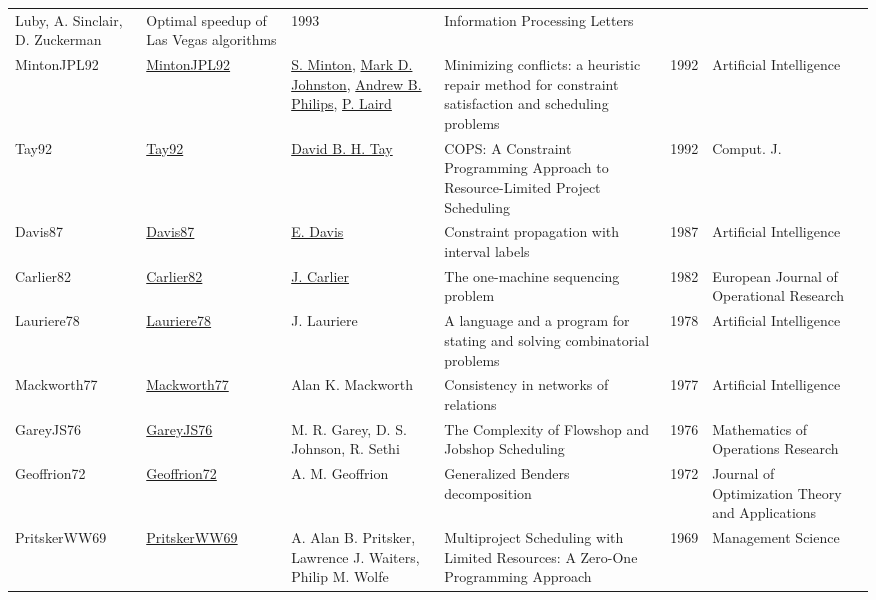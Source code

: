 {\begin{longtable}{p{2cm}p{2cm}p{5cm}p{10cm}rp{3cm}l}
Luby, A. Sinclair, D. Zuckerman & Optimal speedup of Las Vegas algorithms & 1993 & Information Processing Letters & \cite{LubySZ93}\\MintonJPL92 & \href{http://dx.doi.org/10.1016/0004-3702(92)90007-k}{MintonJPL92} & \hyperref[auth:a1236]{S. Minton}, \hyperref[auth:a1237]{Mark D. Johnston}, \hyperref[auth:a1238]{Andrew B. Philips}, \hyperref[auth:a1239]{P. Laird} & Minimizing conflicts: a heuristic repair method for constraint satisfaction and scheduling problems & 1992 & Artificial Intelligence & \cite{MintonJPL92}\\Tay92 & \href{}{Tay92} & \hyperref[auth:a709]{David B. H. Tay} & {COPS:} {A} Constraint Programming Approach to Resource-Limited Project Scheduling & 1992 & Comput. J. & \cite{Tay92}\\Davis87 & \href{http://dx.doi.org/10.1016/0004-3702(87)90091-9}{Davis87} & \hyperref[auth:a1241]{E. Davis} & Constraint propagation with interval labels & 1987 & Artificial Intelligence & \cite{Davis87}\\Carlier82 & \href{http://dx.doi.org/10.1016/s0377-2217(82)80007-6}{Carlier82} & \hyperref[auth:a854]{J. Carlier} & The one-machine sequencing problem & 1982 & European Journal of Operational Research & \cite{Carlier82}\\Lauriere78 & \href{http://dx.doi.org/10.1016/0004-3702(78)90029-2}{Lauriere78} & J. Lauriere & A language and a program for stating and solving combinatorial problems & 1978 & Artificial Intelligence & \cite{Lauriere78}\\Mackworth77 & \href{http://dx.doi.org/10.1016/0004-3702(77)90007-8}{Mackworth77} & Alan K. Mackworth & Consistency in networks of relations & 1977 & Artificial Intelligence & \cite{Mackworth77}\\GareyJS76 & \href{http://dx.doi.org/10.1287/moor.1.2.117}{GareyJS76} & M. R. Garey, D. S. Johnson, R. Sethi & The Complexity of Flowshop and Jobshop Scheduling & 1976 & Mathematics of Operations Research & \cite{GareyJS76}\\Geoffrion72 & \href{http://dx.doi.org/10.1007/bf00934810}{Geoffrion72} & A. M. Geoffrion & Generalized Benders decomposition & 1972 & Journal of Optimization Theory and Applications & \cite{Geoffrion72}\\PritskerWW69 & \href{http://dx.doi.org/10.1287/mnsc.16.1.93}{PritskerWW69} & A. Alan B. Pritsker, Lawrence J. Waiters, Philip M. Wolfe & Multiproject Scheduling with Limited Resources: A Zero-One Programming Approach & 1969 & Management Science & \cite{PritskerWW69}\\\end{longtable}
}

